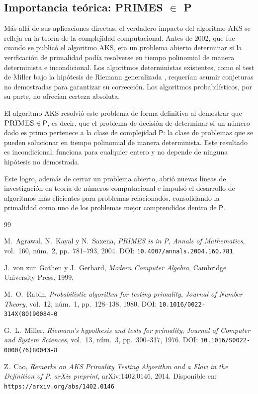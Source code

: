 \documentclass{article}
\begin{document}
\subsection{Importancia teórica: PRIMES $\in$ P}

Más allá de sus aplicaciones directas, el verdadero impacto del algoritmo AKS se refleja
en la teoría de la complejidad computacional. Antes de 2002, que fue cuando se publicó el algoritmo AKS,
era un problema abierto determinar si la verificación de primalidad podía resolverse
en tiempo polinomial de manera determinista e incondicional. Los algoritmos
deterministas existentes, como el test de Miller bajo la hipótesis de Riemann
generalizada \cite{Miller76}, requerían asumir conjeturas no demostradas para garantizar su
corrección. Los algoritmos probabilísticos, por su parte, no ofrecían certeza
absoluta.

El algoritmo AKS resolvió este problema de forma definitiva al demostrar que
$\textsc{PRIMES} \in \textsf{P}$, es decir, que el problema de decisión de determinar
si un número dado es primo pertenece a la clase de complejidad $\textsf{P}$: la clase
de problemas que se pueden solucionar en tiempo polinomial de manera determinista. Este resultado
es incondicional, funciona para cualquier entero y no depende de ninguna
hipótesis no demostrada.

Este logro, además de cerrar un problema abierto, abrió nuevas
líneas de investigación en teoría de números computacional e impulsó el desarrollo
de algoritmos más eficientes para problemas relacionados, consolidando la primalidad
como uno de los problemas mejor comprendidos dentro de $\textsf{P}$.


\begin{thebibliography}{99}

M.~Agrawal, N.~Kayal y N.~Saxena,
\textit{PRIMES is in P},
\textit{Annals of Mathematics}, vol.~160, núm.~2, pp.~781--793, 2004.
\newblock DOI: \texttt{10.4007/annals.2004.160.781}

J.~von zur~Gathen y J.~Gerhard,
\textit{Modern Computer Algebra},
Cambridge University Press, 1999.

M.~O.~Rabin,
\textit{Probabilistic algorithm for testing primality},
\textit{Journal of Number Theory}, vol.~12, núm.~1, pp.~128--138, 1980.
\newblock DOI: \texttt{10.1016/0022-314X(80)90084-0}

G.~L.~Miller,
\textit{Riemann's hypothesis and tests for primality},
\textit{Journal of Computer and System Sciences}, vol.~13, núm.~3, pp.~300--317, 1976.
\newblock DOI: \texttt{10.1016/S0022-0000(76)80043-8}


Z.~Cao,
\textit{Remarks on AKS Primality Testing Algorithm and a Flaw in the
Definition of P},
\textit{arXiv preprint}, arXiv:1402.0146, 2014.
\newblock Disponible en: \texttt{https://arxiv.org/abs/1402.0146}

\end{thebibliography}
\end{document}
